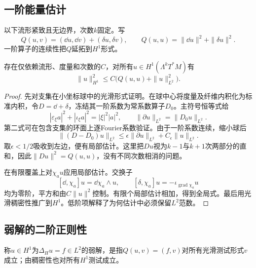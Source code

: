 \subsection*{一阶能量估计}
以下流形紧致且无边界，次数$k$固定。写
\[
 Q(u,v)=(\dd u,\dd v)+(\delta u,\delta v),\qquad
 Q(u,u)=\|\dd u\|^2+\|\delta u\|^2.
\]
一阶算子的连续性把$Q$延拓到$H^1$形式。

\begin{lemma}[Garding估计]\label{lem:hodge-garding}
存在仅依赖流形、度量和次数的$C$，对所有$u\in H^1(\Lambda^kT^*M)$有
\[
 \|u\|_{H^1}^2\leq C\bigl(Q(u,u)+\|u\|_{L^2}^2\bigr).
\]
\end{lemma}
\begin{proof}
先对支集在小坐标球中的光滑形式证明。在球中心将度量及纤维内积化为标准内积，令$D=\dd+\delta$，冻结其一阶系数为常系数算子$D_0$。主符号恒等式给
\[
 |\varepsilon_\xi a|^2+|\iota_\xi a|^2=|\xi|^2|a|^2,
 \qquad \|\partial u\|_{L^2}=\|D_0u\|_{L^2}.
\]
第二式可在包含支集的环面上逐Fourier系数验证。由于一阶系数连续，缩小球后
\[
 \|(D-D_0)u\|_{L^2}
 \leq\epsilon\|\partial u\|_{L^2}+C_\epsilon\|u\|_{L^2}.
\]
取$\epsilon<1/2$吸收到左边，便有局部估计。这里把$Du$视为$k-1$与$k+1$次两部分的直和，因此$\|Du\|^2=Q(u,u)$，没有不同次数相消的问题。

在有限覆盖上对$\chi_au$应用局部估计。交换子
\[
 [\dd,\chi_a]u=\dd\chi_a\wedge u,\qquad
 [\delta,\chi_a]u=-\iota_{\operatorname{grad}\chi_a}u
\]
均为零阶，平方和由$C\|u\|^2$控制。有限个局部估计相加，得到全局式。最后用光滑稠密性推广到$H^1$。低阶项解释了为何估计中必须保留$L^2$范数。
\end{proof}

\subsection*{弱解的二阶正则性}
称$u\in H^1$为$\Delta_Hu=f\in L^2$的弱解，是指$Q(u,v)=(f,v)$对所有光滑测试形式$v$成立；由稠密性也对所有$H^1$测试成立。

